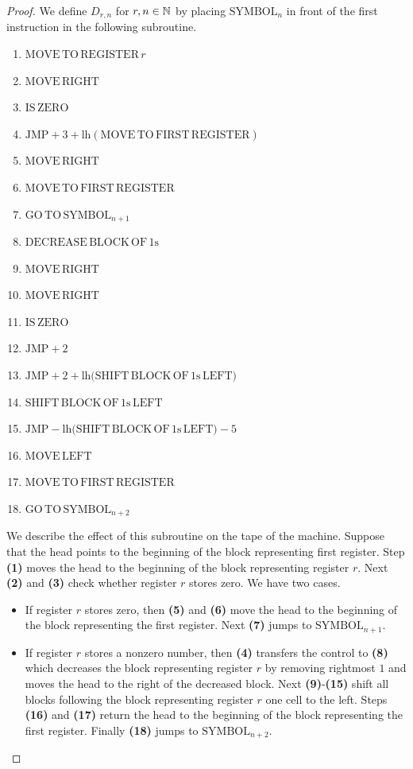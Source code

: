 \documentclass[10pt]{amsart}
\begin{document}
\begin{proof}
	We define $D_{r,n}$ for $r,n\in {\mathbb N}$ by placing $\mathrm{SYMBOL}_n$ in front of the first instruction in the following subroutine.
	\begin{enumerate}[label=\textbf{(\arabic*)}, leftmargin=3.0em]
		\item $\mathrm{MOVE\,TO\,REGISTER\,}r$
		\item $\mathrm{MOVE\,RIGHT}$
		\item $\mathrm{IS\,ZERO}$
		\item $\mathrm{JMP}+3 + \mathrm{lh}\left(\mathrm{MOVE\,TO\,FIRST\,REGISTER}\right)$
		\item $\mathrm{MOVE\,RIGHT}$
		\item $\mathrm{MOVE\,TO\,FIRST\,REGISTER}$
		\item $\mathrm{GO\,TO\,}\mathrm{SYMBOL}_{n+1}$
		\item $\mathrm{DECREASE\,BLOCK\,OF\,1s}$
		\item $\mathrm{MOVE\,RIGHT}$
		\item $\mathrm{MOVE\,RIGHT}$
		\item $\mathrm{IS\,ZERO}$
		\item $\mathrm{JMP}+2$
		\item $\mathrm{JMP}+2 + \mathrm{lh}\big(\mathrm{SHIFT\,BLOCK\,OF\,1s\,LEFT}\big)$
		\item $\mathrm{SHIFT\,BLOCK\,OF\,1s\,LEFT}$
		\item $\mathrm{JMP}-\mathrm{lh}\big(\mathrm{SHIFT\,BLOCK\,OF\,1s\,LEFT}\big) - 5$
		\item $\mathrm{MOVE\,LEFT}$
		\item $\mathrm{MOVE\,TO\,FIRST\,REGISTER}$
		\item $\mathrm{GO\,TO\,}\mathrm{SYMBOL}_{n+2}$
	\end{enumerate}
	We describe the effect of this subroutine on the tape of the machine. Suppose that the head points to the beginning of the block representing first register. Step \textbf{(1)} moves the head to the beginning of the block representing register $r$. Next \textbf{(2)} and \textbf{(3)} check whether register $r$ stores zero. We have two cases.
	\begin{itemize}
		\item If register $r$ stores zero, then \textbf{(5)} and \textbf{(6)} move the head to the beginning of the block representing the first register. Next \textbf{(7)} jumps to $\mathrm{SYMBOL}_{n+1}$.
		\item If register $r$ stores a nonzero number, then \textbf{(4)} transfers the control to \textbf{(8)} which decreases the block representing register $r$ by removing rightmost $1$ and moves the head to the right of the decreased block. Next \textbf{(9)}-\textbf{(15)} shift all blocks following the block representing register $r$ one cell to the left. Steps \textbf{(16)} and \textbf{(17)} return the head to the beginning of the block representing the first register. Finally \textbf{(18)} jumps to $\mathrm{SYMBOL}_{n+2}$.
	\end{itemize}


\end{proof}
\end{document}
